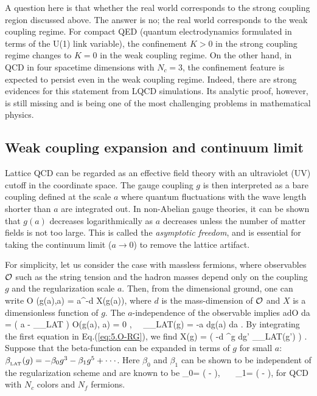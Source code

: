   A question here is that whether the real world 
  corresponds to the strong coupling region discussed above.
  The answer is no;  the real world corresponds to  the weak coupling regime. 
  For compact QED (quantum electrodynamics
  formulated in terms of the  U(1) link variable),
  the confinement  $K>0$ in the strong coupling regime 
   changes to  $K=0$ in the weak coupling regime.
  On the other hand,  in QCD in four spacetime dimensions 
 with $N_c=3$,   the confinement feature is expected to persist even in the weak coupling regime. 
 Indeed, there are  strong evidences for this statement 
  from  LQCD simulations.
  Its analytic proof, however,  is  still missing and is being one of the 
   most challenging problems in mathematical  physics.
   

\subsection{Weak coupling expansion and continuum limit}

  Lattice QCD can be regarded as an effective field theory
   with an ultraviolet (UV)  cutoff in the coordinate space. 
   The gauge coupling  $g$ is then interpreted as
  a bare coupling defined at the scale $a$ where
  quantum fluctuations with the wave length shorter than 
  $a$ are integrated out.  In non-Abelian gauge theories,
   it can be shown that $g(a)$ decreases logarithmically as $a$ decreases
   unless the number of matter fields is not too large.  
    This is called the {\it asymptotic freedom}, and is essential for taking
    the continuum limit ($a \rightarrow 0$) to remove the 
    lattice artifact. 
        
 For simplicity, let us consider the case with massless fermions, where 
 observables
   ${\cal O}$ such as the string tension and the hadron masses  depend only
   on the coupling $g$ and the  regularization scale $a$. 
   Then,  from the dimensional ground, one can  write  
     \beq
\label{eq:5.O-dim}
 {\cal O} (g(a),a) = a^{-d} X(g(a)),
 \eeq
 where $d$ is the mass-dimension of ${\cal O}$ and $X$ is a dimensionless
 function of $g$.  The $a$-independence of the observable implies
 \beq
\label{eq:5.O-RG}
 a{d{\cal O} \over da} 
  =  
  \left( a  
 - \beta_{_{\rm LAT}}   \right) {\cal O}(g(a), a)  = 0 , 
\ \   \beta_{_{\rm LAT}}(g) =  -a {dg(a) \over da} .
\eeq
By integrating the first equation in Eq.(\ref{eq:5.O-RG}),  we find
\beq
\label{eq:5.lat-F}
 X(g) = 
 \exp \left( -d \int^g {dg' \over \beta_{_{\rm LAT}}(g')} \right) .
 \eeq
Suppose that 
 the beta-function can be expanded in terms of $g$ for small $a$:
$\beta_{_{\rm LAT}}(g)   = 
  - \beta_0 g^3 - \beta_1  g^5 + \cdot \cdot \cdot $. Here
  $\beta_0$ and $\beta_1$ can be shown to be independent of the 
   regularization scheme and are known to be 
\beq
\beta_0=  \left( - \right),
\ \ \  \beta_1=  \left( - \right),
\eeq
           for QCD with $N_c$ colors and     $N_f$ fermions.
  
